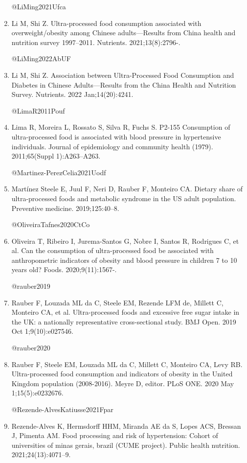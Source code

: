 \documentclass[
]{article}
\begin{document}
\begin{enumerate}
  @LiMing2021Ufca
\item
  Li M, Shi Z. Ultra-processed food consumption associated with
  overweight/obesity among Chinese adults---Results from China health
  and nutrition survey 1997--2011. Nutrients. 2021;13(8):2796-.

  @LiMing2022AbUF
\item
  Li M, Shi Z. Association between Ultra-Processed Food Consumption and
  Diabetes in Chinese Adults---Results from the China Health and
  Nutrition Survey. Nutrients. 2022 Jan;14(20):4241.

  @LimaR2011Pouf
\item
  Lima R, Moreira L, Rossato S, Silva R, Fuchs S. P2-155 Consumption of
  ultra-processed food is associated with blood pressure in hypertensive
  individuals. Journal of epidemiology and community health (1979).
  2011;65(Suppl 1):A263--A263.

  @Martinez-PerezCelia2021Uodf
\item
  Martínez Steele E, Juul F, Neri D, Rauber F, Monteiro CA. Dietary
  share of ultra-processed foods and metabolic syndrome in the US adult
  population. Preventive medicine. 2019;125:40--8.

  @OliveiraTafnes2020CtCo
\item
  Oliveira T, Ribeiro I, Jurema-Santos G, Nobre I, Santos R, Rodrigues
  C, et al. Can the consumption of ultra-processed food be associated
  with anthropometric indicators of obesity and blood pressure in
  children 7 to 10 years old? Foods. 2020;9(11):1567-.

  @rauber2019
\item
  Rauber F, Louzada ML da C, Steele EM, Rezende LFM de, Millett C,
  Monteiro CA, et al. Ultra-processed foods and excessive free sugar
  intake in the UK: a nationally representative cross-sectional study.
  BMJ Open. 2019 Oct 1;9(10):e027546.

  @rauber2020
\item
  Rauber F, Steele EM, Louzada ML da C, Millett C, Monteiro CA, Levy RB.
  Ultra-processed food consumption and indicators of obesity in the
  United Kingdom population (2008-2016). Meyre D, editor. PLoS ONE. 2020
  May 1;15(5):e0232676.

  @Rezende-AlvesKatiusse2021Fpar
\item
  Rezende-Alves K, Hermsdorff HHM, Miranda AE da S, Lopes ACS, Bressan
  J, Pimenta AM. Food processing and risk of hypertension: Cohort of
  universities of minas gerais, brazil (CUME project). Public health
  nutrition. 2021;24(13):4071--9.


\end{enumerate}
\end{document}
